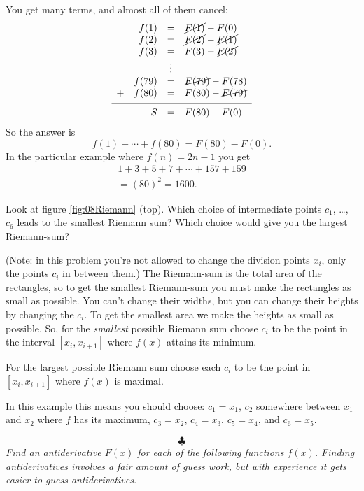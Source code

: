 \begin{multicols}{2}
You get many terms, and almost all of them cancel:
\[
\begin{array}{lrcl}
  &f(1) & = & \cancel{F(1)} - F(0) \\
  &f(2) & = & \cancel{F(2)} - \cancel{F(1)} \\
  &f(3) & = & F(3) - \cancel{F(2)} \\
   && \vdots &\\
   &f(79) & = & \cancel{F(79)} - F(78) \\
   +&f(80) & = & F(80) - \cancel{F(79)} \\[4pt]
  \hline      
  &\rule{0pt}{12pt}
  S & = & F(80) - F(0) \\
\end{array}
\]
So the answer is 
\[
  f(1)+\cdots+f(80) = F(80) - F(0).
\]
In the particular example where $f(n)= 2n-1$ you get
\begin{multline*}
  1+3+5+7+\cdots+157+159 \\
  = (80)^2 = 1600.
\end{multline*}
\endanswer

\problem \groupproblem Look at figure \ref{fig:08Riemann} (top).
Which choice of intermediate points $c_1$, \ldots, $c_6$ leads to the
smallest Riemann sum?  Which choice would give you the largest
Riemann-sum?

(Note: in this problem you're not allowed to change the division points
$x_i$, only the points $c_i$ in between them.)
\answer
The Riemann-sum is the total area of the rectangles, so to get the
smallest Riemann-sum you must make the rectangles as small as
possible.  You can't change their widths, but you can change their
heights by changing the $c_i$.  To get the smallest area we make the
heights as small as possible. So, for the \emph{smallest} possible
Riemann sum choose  $c_i$ to be the point in the interval $[x_i,
x_{i+1}]$ where $f(x)$ attains its minimum.

For the largest possible Riemann sum choose each $c_i$ to be the point
in $[x_i, x_{i+1}]$ where $f(x)$ is maximal.

In this example this means you should choose:  $c_1 = x_1$, $c_2$ somewhere
between $x_1$ and $x_2$ where $f$ has its maximum, $c_3=x_2$, $c_4=x_3$,
$c_5=x_4$, and $c_6 = x_5$.

\endanswer
%
\[
\clubsuit
\]
\begingroup
  \itshape Find an antiderivative $F(x)$ for each of the following
  functions $f(x)$.  Finding antiderivatives involves a fair amount of
  guess work, but with experience it gets easier to guess
  antiderivatives.
\endgroup



\end{multicols}
